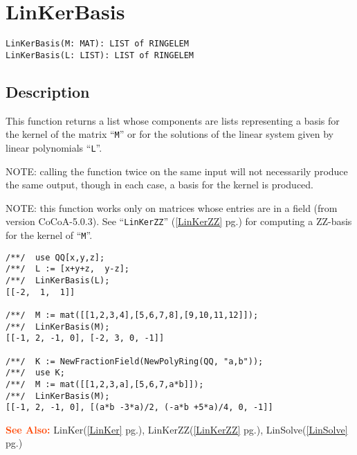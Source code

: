 \documentclass[a4paper]{mybook}
\newenvironment{command}{}{} %
\newcommand\SeeAlso{\par\textcolor{OrangeRed}{\textbf{\large See Also: }}}
\begin{document}
\section{LinKerBasis}
\label{LinKerBasis}
\begin{command} %


\begin{Verbatim}[label=syntax, rulecolor=\color{MidnightBlue},
frame=single]
LinKerBasis(M: MAT): LIST of RINGELEM
LinKerBasis(L: LIST): LIST of RINGELEM
\end{Verbatim}


\subsection*{Description}

This function returns a list whose components are lists representing
a basis for the kernel of the matrix ``\verb&M&'' or for the solutions of the
linear system given by linear polynomials ``\verb&L&''.  
\par 
NOTE: calling the function twice on the same input will not necessarily
produce the same output, though in each case, a basis for the kernel
is produced.
\par 
NOTE: this function works only on matrices whose entries are in a field
(from version CoCoA-5.0.3).  See ``\verb&LinKerZZ&'' (\ref{LinKerZZ} pg.\pageref{LinKerZZ}) for computing a
ZZ-basis for the kernel of ``\verb&M&''.
\begin{Verbatim}[label=example, rulecolor=\color{PineGreen}, frame=single]
/**/  use QQ[x,y,z];
/**/  L := [x+y+z,  y-z];
/**/  LinKerBasis(L);
[[-2,  1,  1]]

/**/  M := mat([[1,2,3,4],[5,6,7,8],[9,10,11,12]]);
/**/  LinKerBasis(M);
[[-1, 2, -1, 0], [-2, 3, 0, -1]]

/**/  K := NewFractionField(NewPolyRing(QQ, "a,b"));
/**/  use K;
/**/  M := mat([[1,2,3,a],[5,6,7,a*b]]);
/**/  LinKerBasis(M);
[[-1, 2, -1, 0], [(a*b -3*a)/2, (-a*b +5*a)/4, 0, -1]]
\end{Verbatim}


\SeeAlso %
  LinKer(\ref{LinKer} pg.\pageref{LinKer}), 
    LinKerZZ(\ref{LinKerZZ} pg.\pageref{LinKerZZ}), 
    LinSolve(\ref{LinSolve} pg.\pageref{LinSolve})
\end{command} %
\end{document}
